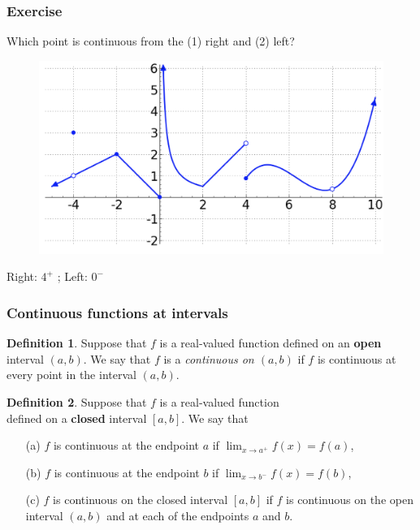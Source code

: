 \documentclass[t]{beamer}
\theoremstyle{plain}
\theoremstyle{definition}
\newtheorem{dfn}{Definition}
\newcommand{\limm}[1]{\displaystyle \lim_{x\to #1}}
\begin{document}
\begin{frame}
\frametitle{Exercise}
Which point is continuous from the (1) right and (2) left? 
	\begin{figure}[l]
	\includegraphics[scale=.4]{fig/con2}
	\label{fig}
	\end{figure}	
	\pause
Right: $4^+$ ; Left: $0^-$
\end{frame}

\begin{frame}
\frametitle{Continuous functions at intervals}

\begin{dfn}
Suppose that $f$ is a real-valued function defined on an \textbf{open} interval $(a,b)$. We say that $f$ is a \textit{continuous on $(a,b)$} if $f$ is continuous at every point in the interval $(a,b)$.
\end{dfn}

\begin{dfn}
Suppose that $f$ is a real-valued function\\ defined on a \textbf{closed} interval $[a,b]$. We say that
\begin{enumerate}
\item[(a)] $f$ is continuous at the endpoint $a$ if $\limm{a^+}f(x)=f(a)$,
\item[(b)] $f$ is continuous at the endpoint $b$ if $\limm{b^-}f(x)=f(b)$,
\item[(c)] $f$ is continuous on the closed interval $[a,b]$ if $f$ is continuous on the open interval $(a,b)$ and at each of the endpoints $a$ and $b$.
\end{enumerate}
\end{dfn}

\end{frame}
\end{document}
